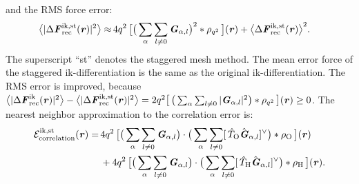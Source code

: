 \documentclass[aps,pre,preprint,unsortedaddress]{revtex4}
\renewcommand{\v}[1]{\textbf{\textit{#1}}}
\begin{document}
and the RMS force error:
\begin{align}\label{eqn:ik.st.error}
  \big\langle
  \vert\Delta\v F_{\textrm{rec}}^{\textrm{ik,st}}(\v r)\vert^2
  \big\rangle
  \approx&\,
  4q^2\,
  \big[
  \big(
  \sum_{\alpha} \sum_{l\neq 0}  
  \v G_{\alpha,l}
  \big)^2
  \ast \rho_{q^2}\,
  \big] (\v r) +
  \big\langle
  \Delta\v F_{\textrm{rec}}^{\textrm{ik,st}}(\v r)
  \big\rangle^2.
\end{align}
The superscript ``st'' denotes the staggered mesh method.
The mean error force of the staggered ik-differentiation is the
same as the original ik-differentiation.
The RMS error is improved, because
$\big\langle\vert\Delta\v F_{\textrm{rec}}^{\textrm{ik}}(\v r)\vert^2\big\rangle -
\big\langle\vert\Delta\v F_{\textrm{rec}}^{\textrm{ik,st}}(\v r)\vert^2\big\rangle=
2q^2
\big[\,
\big(
\sum_{\alpha} \sum_{l\neq 0}
\vert \v G_{\alpha,l}\vert^2
\big)
\ast \rho_{q^2}
\,\big] (\v r) \geq 0$.
The nearest neighbor approximation to the correlation error is:
\begin{align}\nonumber
  \mathcal E^{\textrm{ik,st}}_{\textrm{correlation}}(\v r)
  =\,&
  4q^2\,
  \big[
  \big(
  \sum_{\alpha} \sum_{l\neq 0}  
  \v G_{\alpha,l}
  \big)
  \cdot
  \big(
  \sum_{\alpha} \sum_{l\neq 0}  
  [\,\hat T_{\textrm{O}}\hat{\v G}_{\alpha,l}]^{\vee}
  \big)
  \ast \rho_{\textrm{O}}\,
  \big] (\v r) \\\nonumber
  \,&+
  4q^2\,
  \big[
  \big(
  \sum_{\alpha} \sum_{l\neq 0}  
  \v G_{\alpha,l}
  \big)
  \cdot
  \big(
  \sum_{\alpha} \sum_{l\neq 0}  
  [\,\hat T_{\textrm{H}}\hat{\v G}_{\alpha,l}]^{\vee}
  \big)
  \ast \rho_{\textrm{H}}\,
  \big] (\v r).
\end{align}
\end{document}
